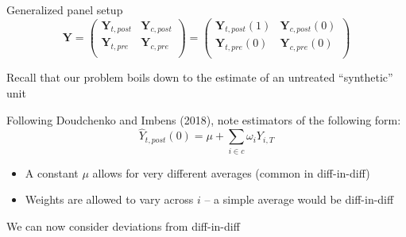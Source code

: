 \documentclass[notes,11pt, aspectratio=169]{beamer}
\newenvironment{wideitemize}{\itemize\addtolength{\itemsep}{10pt}}{\enditemize}
\begin{document}
\begin{frame}{Generalized panel setup}
      \begin{equation*}
        \mathbf{Y} = \left( \begin{array}{cc}
                              \mathbf{Y}_{t,post} & \mathbf{Y}_{c,post} \\
                              \mathbf{Y}_{t,pre} & \mathbf{Y}_{c,pre} \\
                            \end{array}
                            \right) =  \left( \begin{array}{cc}
                              \mathbf{Y}_{t,post}(1) & \mathbf{Y}_{c,post}(0) \\
                              \mathbf{Y}_{t,pre}(0) & \mathbf{Y}_{c,pre}(0) \\
                            \end{array}
                            \right)
      \end{equation*}
      \begin{wideitemize}
      \item Recall that our problem boils down to the estimate of an untreated ``synthetic'' unit
      \item Following Doudchenko and Imbens (2018), note estimators of the following form:
        \begin{equation*}
          \hat{Y}_{t,post}(0) = \mu + \sum_{i \in c}\omega_{i} Y_{i, T}
        \end{equation*}
        \begin{itemize}
        \item A constant $\mu$ allows for very different averages (common in diff-in-diff)
        \item Weights are allowed to vary across $i$ -- a simple
          average would be diff-in-diff
        \end{itemize}
      \item We can now consider deviations from diff-in-diff
      \end{wideitemize}
\end{frame}
\end{document}
